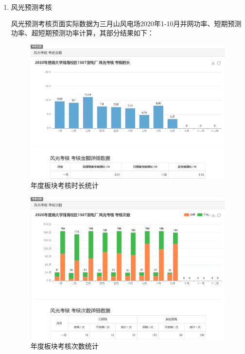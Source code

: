 \documentclass[winfonts,UTF8,a4paper]{ctexart}
\begin{document}
\begin{enumerate}
	\item 风光预测考核
	
	风光预测考核页面实际数据为三月山风电场2020年1-10月并网功率、短期预测功率、超短期预测功率计算，其部分结果如下：
	\begin{figure}[H]
		\centering
		\includegraphics[width=0.7\linewidth]{pic/screenshot016_看图王}
		\caption{年度板块考核时长统计}
		\label{fig:screenshot016}
	\end{figure}
	
	
	\begin{figure}[H]
		\centering
		\includegraphics[width=0.7\linewidth]{pic/screenshot017_看图王}
		\caption{年度板块考核次数统计}
		\label{fig:screenshot017}
	\end{figure}
	
	

\end{enumerate}
\end{document}
